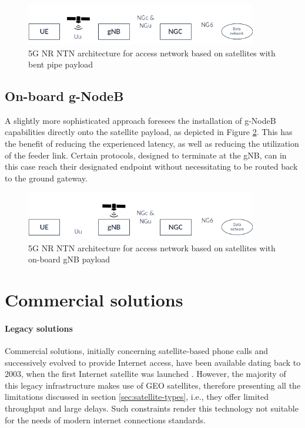 \begin{figure}[ht]
    \centering
    \includegraphics[width=0.9\textwidth]{res/ntn-bent-pipe.png}
    \caption{5G NR NTN architecture for access network based on satellites with bent pipe payload \cite{3gpp-tr-38.811}}
    \label{fig:ntn-bent-pipe}
\end{figure}

\subsection{On-board g-NodeB}
\label{sec:onboard-gnb}
A slightly more sophisticated approach foresees the installation of g-NodeB capabilities directly onto the satellite payload, as depicted in Figure \ref{fig:ntn-gnb-onboard}. This has the benefit of reducing the experienced latency, as well as reducing the utilization of the feeder link. Certain protocols, designed to terminate at the \ac{gNB}, can in this case reach their designated endpoint without necessitating to be routed back to the ground gateway.

\begin{figure}[ht]
    \centering
    \includegraphics[width=0.9\textwidth]{res/ntn-regen.png}
    \caption{5G NR NTN architecture for access network based on satellites with on-board gNB payload \cite{3gpp-tr-38.811}}
    \label{fig:ntn-gnb-onboard}
\end{figure}

\section{Commercial solutions}
\paragraph{Legacy solutions}
Commercial solutions, initially concerning satellite-based phone calls and successively evolved to provide Internet access, have been available dating back to 2003, when the first Internet satellite was launched \cite{first_internet_sat}. However, the majority of this legacy infrastructure makes use of \ac{GEO} satellites, therefore presenting all the limitations discussed in section \ref{sec:satellite-types}, i.e., they offer limited throughput and large delays. Such constraints render this technology not suitable for the needs of modern internet connections standards.

